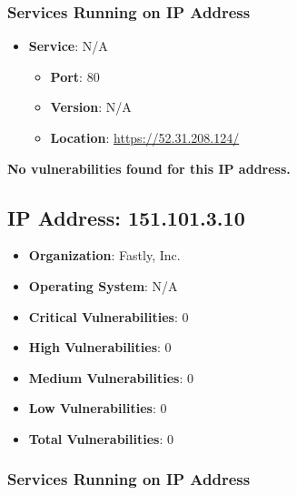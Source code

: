 \documentclass{article}
\begin{document}
\subsubsection*{Services Running on IP Address}

\begin{itemize}
    
        \item \textbf{Service}: N/A
        \begin{itemize}
            \item \textbf{Port}: 80
            \item \textbf{Version}:  N/A 
            \item \textbf{Location}: \href{ https://52.31.208.124/ }{ https://52.31.208.124/ }
        \end{itemize}
    
\end{itemize}


\textbf{No vulnerabilities found for this IP address.}




\clearpage



\subsection{IP Address: 151.101.3.10}

\begin{itemize}
    \item \textbf{Organization}: Fastly, Inc.
    \item \textbf{Operating System}:  N/A 
    \item \textbf{Critical Vulnerabilities}: 0
    \item \textbf{High Vulnerabilities}: 0
    \item \textbf{Medium Vulnerabilities}: 0
    \item \textbf{Low Vulnerabilities}: 0
    \item \textbf{Total Vulnerabilities}: 0
\end{itemize}

\subsubsection*{Services Running on IP Address}
\end{document}
